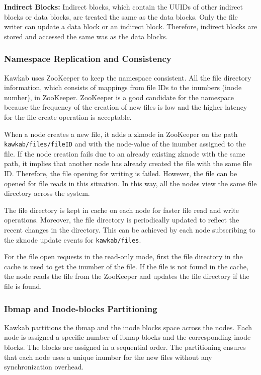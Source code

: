 \documentclass[]{article}
\newcommand{\subtopic}[1]{\vspace{1.5pt} \noindent \textbf{#1}}
\begin{document}
\subtopic{Indirect Blocks:} Indirect blocks, which contain the UUIDs of other
indirect blocks or data blocks, are treated the same as the data blocks.
Only the file writer can update a data block or an indirect block. Therefore,
indirect blocks are stored and accessed the same was as the data blocks.


\subsubsection{Namespace Replication and Consistency}
Kawkab uses ZooKeeper to keep the namespace consistent. All the file
directory information, which consists of mappings from file IDs to the
inumbers (inode number), in ZooKeeper. ZooKeeper is a good candidate
for the namespace because the frequency of the creation of new files is low
and the higher latency for the file create operation is acceptable.

When a node creates a new file, it adds a zknode in ZooKeeper on the path
\texttt{kawkab/files/fileID} and with the node-value of the inumber assigned to
the file. If the node creation fails due to an already existing zknode with
the same path, it implies that another node has already created the file with the same
file ID. Therefore, the file opening for writing is failed. However, the file can be
opened for file reads in this situation. In this way, all the nodes view
the same file directory across the system.

The file directory is kept in cache on each node for faster file read and write
operations. Moreover, the file directory is periodically updated to reflect the
recent changes in the directory. This can be achieved by each node subscribing
to the zknode update events for \texttt{kawkab/files}.

For the file open requests in the read-only mode, first the file directory in
the cache is used to get the inumber of the file. If the file is not found in
the cache, the node reads the file from the ZooKeeper and updates the file
directory if the file is found.



\subsubsection{Ibmap and Inode-blocks Partitioning} Kawkab partitions the ibmap
and the inode blocks space across the nodes. Each node is assigned a specific
number of ibmap-blocks and the corresponding inode blocks.
The blocks are assigned in a sequential order. The partitioning ensures that
each node uses a unique inumber for the new files without any synchronization
overhead.
\end{document}
